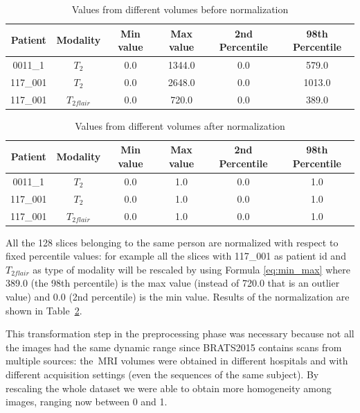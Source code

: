 \vspace{2mm}
\begin{table}
\centering
\begin{tabular}{cccccc}
\toprule
Patient & Modality & Min value	& Max value & 2nd Percentile & 98th Percentile\\
\midrule
0011\_1 & $T_{2}$ & 0.0				& 1344.0 & 0.0 & 579.0\\
117\_001 & $T_{2}$ & 0.0				& 2648.0 & 0.0 & 1013.0\\
117\_001 & $T_{2flair}$ & 0.0				& 720.0 & 0.0 & 389.0\\

\bottomrule	
\end{tabular}
\caption{Values from different volumes before normalization}
\label{tab:before_norm}
\end{table}

\begin{table}
\centering
\begin{tabular}{cccccc}
\toprule
Patient & Modality & Min value	& Max value & 2nd Percentile & 98th Percentile\\
\midrule
0011\_1 & $T_{2}$ & 0.0				& 1.0 & 0.0 & 1.0\\
117\_001 & $T_{2}$ & 0.0				& 1.0 & 0.0 & 1.0\\
117\_001 & $T_{2flair}$ & 0.0				& 1.0 & 0.0 & 1.0\\
\bottomrule	
\end{tabular}
\caption{Values from different volumes after normalization}
\label{tab:after_norm}
\end{table}


All the 128 slices belonging to the same person are normalized with respect to fixed percentile values: for example all the slices with 117\_001 as patient id and $T_{2flair}$ as type of modality will be rescaled by using Formula \ref{eq:min_max} where 389.0 (the 98th percentile) is the max value (instead of 720.0 that is an outlier value) and 0.0 (2nd percentile) is the min value. Results of the normalization are shown in Table~\ref{tab:after_norm}.

\vspace{2mm} %
This transformation step in the preprocessing phase was necessary because not all the images had the same dynamic range since BRATS2015 contains scans from multiple sources: the~\ac{MRI} volumes were obtained in different hospitals and with different acquisition settings (even the sequences of the same subject). By rescaling the whole dataset we were able to obtain more homogeneity among images, ranging now between 0 and 1.


